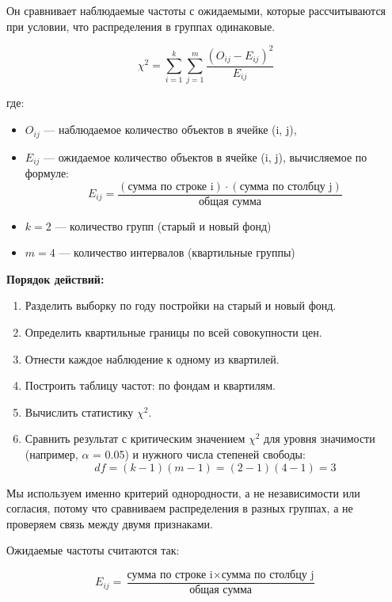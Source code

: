 \documentclass[12pt]{article}
\begin{document}
	Он сравнивает наблюдаемые частоты с ожидаемыми, которые рассчитываются при условии, что распределения в группах одинаковые.
	
	$$ \chi^2 = \sum_{i=1}^{k} \sum_{j=1}^{m} \frac{(O_{ij} - E_{ij})^2}{E_{ij}} $$
	
	где:
	\begin{itemize}
		\item $ O_{ij} $ — наблюдаемое количество объектов в ячейке (i, j),
		\item $ E_{ij} $ — ожидаемое количество объектов в ячейке (i, j), вычисляемое по формуле: $$ E_{ij} = \frac{(\text{сумма по строке i}) \cdot (\text{сумма по столбцу j})}{\text{общая сумма}} $$
		\item $ k = 2 $ — количество групп (старый и новый фонд)
		\item $ m = 4 $ — количество интервалов (квартильные группы)
	\end{itemize}
	\vspace*{3em}
	
	\textbf{Порядок действий: }
	\begin{enumerate}
		\item Разделить выборку по году постройки на старый и новый фонд.
		
		\item Определить квартильные границы по всей совокупности цен.
		
		\item Отнести каждое наблюдение к одному из квартилей.
		
		\item Построить таблицу частот: по фондам и квартилям.
		
		\item Вычислить статистику $\chi^2$.
		
		\item Сравнить результат с критическим значением $\chi^2$ для уровня значимости (например, $\alpha$ = 0.05) и нужного числа степеней свободы:  
		$$ df = (k - 1)(m - 1) = (2 - 1)(4 - 1) = 3 $$
	\end{enumerate}
	Мы используем именно критерий однородности, а не независимости или согласия, потому что сравниваем распределения в разных группах, а не проверяем связь между двумя признаками.
	\vspace*{3em}
	
	Ожидаемые частоты считаются так:
	
	$$ E_{ij} = \frac{\text{сумма по строке i} \times \text{сумма по столбцу j}}{\text{общая сумма}} $$
	
\end{document}
